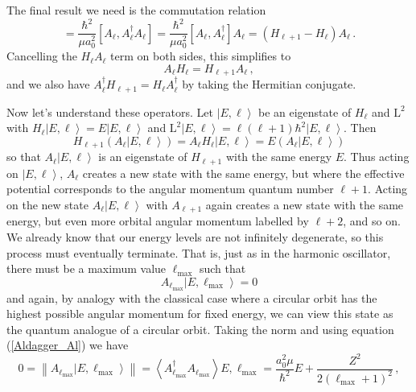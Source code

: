 \documentclass{article}
\theoremstyle{plain}\theoremheaderfont{\normalfont\itshape}\theorembodyfont{\rmfamily}\theoremseparator{.}\newtheorem*{rem}{Remark}\newtheorem*{ex}{Example}\newtheorem*{proof}{Proof}\newtheorem*{altp}{Alternative proof}
\theoremstyle{plain}\theoremheaderfont{\normalfont\bfseries}\theorembodyfont{\rmfamily}\theoremseparator{.}\newtheorem{thm}{Theorem}[section]\newtheorem{lem}[thm]{Lemma}\newtheorem{prop}[thm]{Proposition}\newtheorem*{cor}{Corollary}\newtheorem{defn}[thm]{Definition}\newtheorem{clm}[thm]{Claim}\newtheorem{clminproof}{Claim}
\theoremstyle{break}\theoremheaderfont{\normalfont\itshape}\theorembodyfont{\rmfamily}\theoremseparator{.\medskip}\newtheorem*{proofskip}{Proof}\newtheorem*{exs}{Examples}\newtheorem*{rems}{Remarks}
\theoremstyle{break}\theoremheaderfont{\normalfont\bfseries}\theorembodyfont{\rmfamily}\theoremseparator{.\medskip}\newtheorem{lemskip}[thm]{Lemma}\newtheorem{defnskip}[thm]{Definition}\newtheorem{propskip}[thm]{Proposition}\newtheorem{thmskip}[thm]{Theorem}
\numberwithin{equation}{section}
\newcommand{\ket}[1]{\left| #1 \right\rangle}
\newcommand{\eval}[1]{\left\langle #1 \right\rangle}
\newcommand{\vb}[1]{\bm{\mathrm{#1}}}
\newcommand{\norm}[1]{\left\| #1 \right\|}
\begin{document}
    The final result we need is the commutation relation
    \begin{equation}
        [A_\ell,H_\ell]=\frac{\hbar^2}{\mu a_0^2}\left[A_\ell,A_\ell^\dagger A_\ell\right]=\frac{\hbar^2}{\mu a_0^2}\left[A_\ell,A_\ell^\dagger\right]A_\ell=(H_{\ell+1}-H_\ell)A_\ell\,.
    \end{equation}
    Cancelling the \(H_\ell A_\ell\) term on both sides, this simplifies to
    \begin{equation}
        A_\ell H_\ell=H_{\ell+1}A_\ell\,,
    \end{equation}
    and we also have \(A_\ell^\dagger H_{\ell+1}=H_\ell A_\ell^\dagger\) by taking the Hermitian conjugate.

    Now let's understand these operators. Let \(\ket{E,\ell}\) be an eigenstate of \(H_\ell\) and \(\vb{L}^2\) with \(H_\ell\ket{E,\ell}=E\ket{E,\ell}\) and \(\vb{L}^2\ket{E,\ell}=\ell(\ell+1)\hbar^2\ket{E,\ell}\). Then
    \begin{equation}
        H_{\ell+1}(A_\ell\ket{E,\ell})=A_\ell H_\ell\ket{E,\ell}=E(A_\ell\ket{E,\ell})
    \end{equation}
    so that \(A_\ell\ket{E,\ell}\) is an eigenstate of \(H_{\ell+1}\) with the same energy \(E\). Thus acting on \(\ket{E,\ell}\), \(A_\ell\) creates a new state with the same energy, but where the effective potential corresponds to the angular momentum quantum number \(\ell+1\). Acting on the new state \(A_{\ell}\ket{E,\ell}\) with \(A_{\ell+1}\) again creates a new state with the same energy, but even more orbital angular momentum labelled by \(\ell+2\), and so on. We already know that our energy levels are not infinitely degenerate, so this process must eventually terminate. That is, just as in the harmonic oscillator, there must be a maximum value \(\ell_{\text{max}}\) such that
    \begin{equation}
        A_{\ell_{\text{max}}}\ket{E,\ell_{\text{max}}}=0
    \end{equation}
    and again, by analogy with the classical case where a circular orbit has the highest possible angular momentum for fixed energy, we can view this state as the quantum analogue of a circular orbit. Taking the norm and using equation (\ref{Aldagger_Al}) we have
    \begin{equation}
        0=\norm{A_{\ell_{\text{max}}}\ket{E,\ell_{\text{max}}}}=\eval{A_{\ell_{\text{max}}}^\dagger A_{\ell_{\text{max}}}}{E,\ell_{\text{max}}}=\frac{a_0^2\mu}{\hbar^2}E+\frac{Z^2}{2(\ell_{\text{max}}+1)^2}\,,
    \end{equation}
\end{document}
